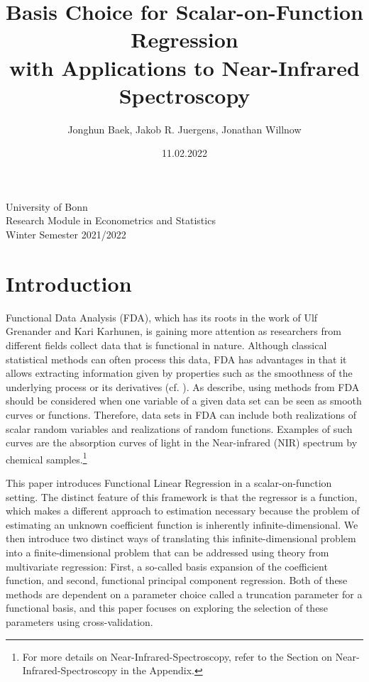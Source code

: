 \documentclass[11pt,twoside,a4paper]{article}
\begin{document}
	\title{{\LARGE Basis Choice for Scalar-on-Function Regression \\ with Applications to Near-Infrared Spectroscopy}}
	\author{Jonghun Baek, Jakob R. Juergens, Jonathan Willnow}
	\date{11.02.2022}
	\maketitle
	\vspace{1.5 cm}
	\begin{center}
		University of Bonn \\
		Research Module in Econometrics and Statistics \\
		Winter Semester 2021/2022
	\end{center}
	
	\newpage
	
	\tableofcontents
	
	\newpage
	
	\setlength{\abovedisplayskip}{0.4cm}
	\setlength{\belowdisplayskip}{0.4cm}

	\setlength{\abovedisplayshortskip}{0.2cm}
	\setlength{\belowdisplayshortskip}{0.4cm}

	\section{Introduction}
		
	Functional Data Analysis (FDA), which has its roots in the work of Ulf Grenander and Kari Karhunen, is gaining more attention as researchers from different fields collect data that is functional in nature. Although classical statistical methods can often process this data, FDA has advantages in that it allows extracting information given by properties such as the smoothness of the underlying process or its derivatives (cf. \cite{levitin_introduction_2007}).	As \cite{kokoszka_introduction_2017} describe, using methods from FDA should be considered when one variable of a given data set can be seen as smooth curves or functions.	 
	Therefore, data sets in FDA can include both realizations of scalar random variables and realizations of random functions. Examples of such curves are the absorption curves of light in the Near-infrared (NIR) spectrum by chemical samples.\footnote{For more details on Near-Infrared-Spectroscopy, refer to the Section on Near-Infrared-Spectroscopy in the Appendix.}
	
	This paper introduces Functional Linear Regression in a scalar-on-function setting. The distinct feature of this framework is that the regressor is a function, which makes a different approach to estimation necessary because the problem of estimating an unknown coefficient function is inherently infinite-dimensional. 
	We then introduce two distinct ways of translating this infinite-dimensional problem into a finite-dimensional problem that can be addressed using theory from multivariate regression: First, a so-called basis expansion of the coefficient function, and second, functional principal component regression. Both of these methods are dependent on a parameter choice called a truncation parameter for a functional basis, and this paper focuses on exploring the selection of these parameters using cross-validation.\\
	
\end{document}
